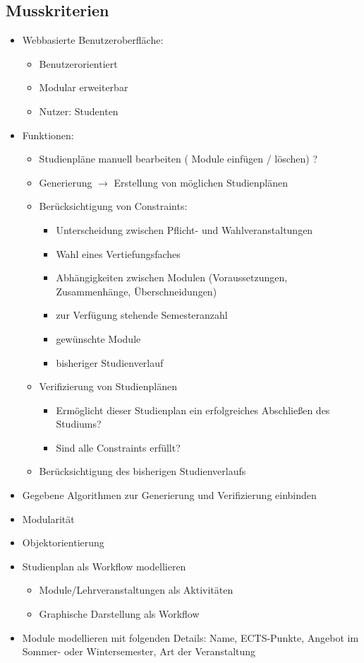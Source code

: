 \documentclass[titlepage=true, parskip=full]{scrartcl}
\begin{document}
\subsection{Musskriterien}
\begin{itemize}
	\item Webbasierte Benutzeroberfläche:
	\begin{itemize}
		\item Benutzerorientiert 
		\item Modular erweiterbar
		\item Nutzer: Studenten
	\end{itemize}
	\item Funktionen:
	\begin{itemize}
		\item Studienpläne manuell bearbeiten ( Module einfügen / löschen) ?
		\item Generierung $\rightarrow$ Erstellung von möglichen Studienplänen
		\item Berücksichtigung von Constraints:
		\begin{itemize}
			\item Unterscheidung zwischen Pflicht- und Wahlveranstaltungen
			\item Wahl eines Vertiefungsfaches
			\item Abhängigkeiten zwischen Modulen (Voraussetzungen, Zusammenhänge, Überschneidungen)
			\item zur Verfügung stehende Semesteranzahl
			\item gewünschte Module
			\item bisheriger Studienverlauf
		\end{itemize}
		\item Verifizierung von Studienplänen
		\begin{itemize}
			\item Ermöglicht dieser Studienplan ein erfolgreiches Abschließen des Studiums?
			\item Sind alle Constraints erfüllt?
		\end{itemize}
		\item Berücksichtigung des bisherigen Studienverlaufs
	\end{itemize}
	\item Gegebene Algorithmen zur Generierung und Verifizierung einbinden
	\item Modularität
	\item Objektorientierung
	\item Studienplan als Workflow modellieren
	\begin{itemize}
		\item Module/Lehrveranstaltungen als Aktivitäten
		\item Graphische Darstellung als Workflow
	\end{itemize}
	\item Module modellieren mit folgenden Details: Name, ECTS-Punkte, Angebot im Sommer- oder Wintersemester, Art der Veranstaltung
\end{itemize}
\end{document}
